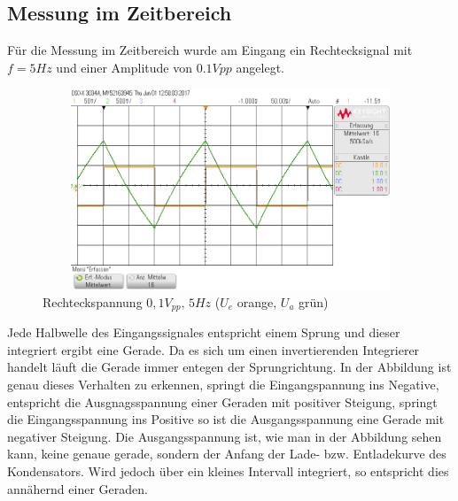 \subsection{Messung im Zeitbereich}
F\"ur die Messung im Zeitbereich wurde am Eingang ein Rechtecksignal mit $f=5Hz$ und einer Amplitude von $0.1Vpp$ angelegt.

\begin{figure}[H]
 \begin{center}
  \includegraphics[height=6cm,width=12cm]{OsziBilder/invInte_bigScal.png}
 \end{center}
 \caption{Rechteckspannung $0,1V_{pp}$, $5Hz$ ($U_e$ orange, $U_a$ grün)}
\end{figure}
\noindent
Jede Halbwelle des Eingangssignales entspricht einem Sprung und dieser integriert ergibt eine Gerade. Da es sich um einen invertierenden Integrierer handelt l\"auft die Gerade immer entegen der Sprungrichtung. In der Abbildung ist genau dieses Verhalten zu erkennen, springt die Eingangspannung ins Negative, entspricht die Ausgnagsspannung einer Geraden mit positiver Steigung, springt die Eingangsspannung ins Positive so ist die Ausgangsspannung eine Gerade mit negativer Steigung.
Die Ausgangsspannung ist, wie man in der Abbildung sehen kann, keine genaue gerade, sondern der Anfang der Lade- bzw. Entladekurve des Kondensators. Wird jedoch über ein kleines Intervall integriert, so entspricht dies annähernd einer Geraden.\\
\newpage
